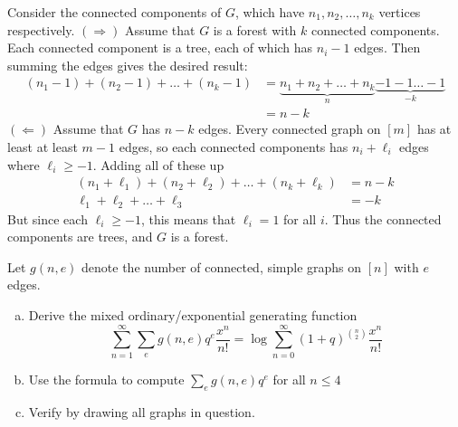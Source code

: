 \documentclass{article}
\newenvironment{problem}[2][Problem]{\begin{trivlist}
\item[\hskip \labelsep {\bfseries #1}\hskip \labelsep {\bfseries #2.}]}{\end{trivlist}}
\newenvironment{solution}[1][Solution.]{\begin{trivlist}
\item[\hskip \labelsep {\bfseries #1}]}{\end{trivlist}}
\begin{document}
\begin{solution} $ $\\
  Consider the connected components of $G$, which have $n_1, n_2, \hdots, n_k$
  vertices respectively.
  $(\Longrightarrow)$ Assume that $G$ is a forest with $k$ connected components.
  \\
  Each connected component is a tree, each of which
  has  $n_i - 1$ edges. Then summing the edges gives the desired result: \begin{align*}
    (n_1 - 1) + (n_2 - 1) + \hdots + (n_k - 1)
    &= \underbrace{n_1 + n_2 + \hdots + n_k}_n \underbrace{- 1 - 1 \hdots - 1}_{-k} \\
    &= n - k
  \end{align*}
  $(\Longleftarrow)$ Assume that $G$ has $n-k$ edges. Every connected graph on
  $[m]$ has at least at least $m-1$ edges, so each connected components has
  $n_i + \ell_i$ edges where $\ell_i \geq -1$.
  Adding all of these up \begin{align*}
    (n_1 + \ell_1) + (n_2 + \ell_2) + \hdots + (n_k + \ell_k) &= n - k \\
    \ell_1 + \ell_2 + \hdots + \ell_3 &= -k
  \end{align*}
  But since each $\ell_i \geq -1$, this means that $\ell_i = 1$ for all $i$.
  Thus the connected components are trees, and $G$ is a forest.
\end{solution}
\pagebreak
%
%
\begin{problem}{4}
  Let $g(n, e)$ denote the number of connected, simple graphs on $[n]$ with $e$
  edges.
  \begin{enumerate}[(a)]
    \item  Derive the mixed ordinary/exponential generating function \[
      \sum_{n=1}^{\infty}\sum_e g(n,e)q^e \frac{x^n}{n!}
      = \log\sum_{n=0}^{\infty} (1+q)^{\binom n2} \frac{x^n}{n!}
    \]
    \item Use the formula to compute $\sum_e g(n,e) q^e$ for all $n \leq 4$
    \item Verify by drawing all graphs in question.
  \end{enumerate}
\end{problem}
\end{document}
